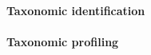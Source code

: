 \paragraph{Taxonomic identification}\label{back:taxonomic_id}

\paragraph{Taxonomic profiling}\label{back:taxonomic_profiling}



% 
